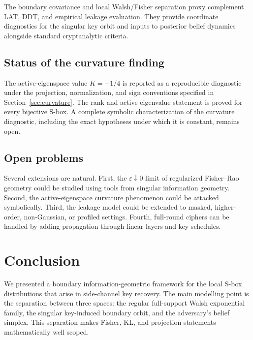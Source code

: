 \documentclass[referee,lineno,pdflatex,sn-mathphys-num]{sn-jnl}
\theoremstyle{thmstylethree}
\theoremstyle{thmstyletwo}
\theoremstyle{thmstyleone}
\begin{document}
The boundary covariance and local Walsh/Fisher separation proxy complement LAT,
DDT, and empirical leakage evaluation.  They provide coordinate diagnostics
for the singular key orbit and inputs to posterior belief dynamics alongside
standard cryptanalytic criteria.

\subsection{Status of the curvature finding}

The active-eigenspace value \(K=-1/4\) is reported as a reproducible diagnostic
under the projection, normalization, and sign conventions specified in
Section~\ref{sec:curvature}.  The rank and active eigenvalue statement is
proved for every bijective S-box.  A complete symbolic characterization of the
curvature diagnostic, including the exact hypotheses under which it is
constant, remains open.

\subsection{Open problems}\label{subsec:extensions}

Several extensions are natural.  First, the $\varepsilon\downarrow0$ limit of
regularized Fisher--Rao geometry could be studied using tools from singular
information geometry.  Second, the active-eigenspace curvature phenomenon
could be attacked symbolically.  Third, the leakage model could be extended to
masked, higher-order, non-Gaussian, or profiled settings.  Fourth, full-round
ciphers can be handled by adding propagation through linear layers and key
schedules.

\section{Conclusion}\label{sec:conclusion}

We presented a boundary information-geometric framework for the local S-box
distributions that arise in side-channel key recovery.  The main modelling
point is the separation between three spaces: the regular full-support Walsh
exponential family, the singular key-induced boundary orbit, and the
adversary's belief simplex.  This separation makes Fisher, KL, and projection
statements mathematically well scoped.
\end{document}
